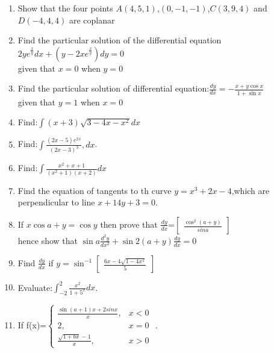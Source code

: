 \documentclass[12pt,-letter paper]{article}
\providecommand{\myvec}[1]{\ensuremath{\begin{bmatrix}#1\end{bmatrix}}}
\providecommand{\brak}[1]{\ensuremath{\left(#1\right)}}
\begin{document}
\begin{enumerate}
	\item Show that the four points $A\brak{4,5,1}$,$\brak{0,-1,-1}$,$C\brak{3,9,4}$ and $D\brak{-4,4,4}$ are coplanar



\item Find the particular solution of the differential equation $2ye^\frac{x}{y}dx+\brak{{y-2xe^\frac{x}{y}}}dy=0$\\
	given that $x=0$  when $y=0$




\item Find the particular solution of differential equation:$\frac{dy}{dx}=-\frac{x+y\cos x}{1+\sin x}$\\ given that $y=1$ when $x=0$ 


    \item Find:$\int{\brak{x+3}}\sqrt{3-4x-x^2}dx$      



\item Find:$\int\frac{\brak{2x-5}e^2{}^x}{\brak{2x-3}^3},dx$.


\item Find:$\int\frac{x^2+x+1}{\brak{x^2+1}\brak
	{x+2}}dx$


  \item Find the equation of tangents to th curve $y    =x^3+2x-4$,which are perpendicular to line $x+14y+3=0$.
		  
  \item If $x\cos{a+y}=\cos{y}$ then prove that $\frac{dy}{dx}$=$\myvec{\frac{\cos^2 \brak{a+y}}{sina}}$\\
	  hence show that $\sin a\frac{d^{2}y}{dx^2}+\sin2\brak{a+y}\frac{dy}{dx}=0$

   
  \item Find $\frac{dy}{dx}$ if $y=\sin^{-1}\myvec{\frac{6x-4\sqrt{1-4x^2}}{5}}$



  \item Evaluate:$\int_{-2}^{2}\frac{x^2}{1+5^x}dx$.

  \item If f(x)=$\begin{cases}
		  \frac{\sin(a+1)x+2 sinx}{x},&x<0\\
		  2,  &x=0\\
		  \frac{\sqrt{1+bx}-1}{x},&x>0
  \end{cases}$ .





\end{enumerate}
\end{document}
